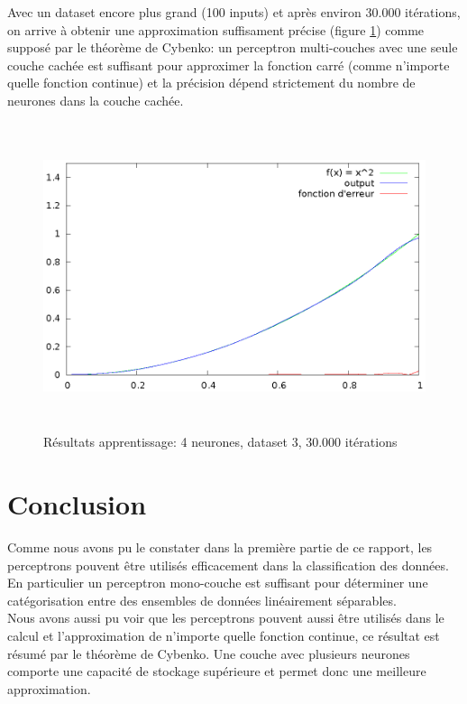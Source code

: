 \documentclass[twoside,openright,a4paper,11pt,french]{article}
\begin{document}
Avec un dataset encore plus grand (100 inputs) et après environ
30.000 itérations, on arrive à obtenir une approximation suffisament
précise (figure \ref{fig:chartsqtest5}) comme supposé par le théorème de Cybenko:
un perceptron multi-couches avec une seule couche cachée est suffisant pour
approximer la fonction carré (comme n'importe quelle fonction continue) 
et la précision dépend strictement du nombre de neurones dans la couche cachée.

\begin{figure}[ht]
\centering
\includegraphics[width=12cm,height=9cm]{./pics/chartsqtest5.eps}
\caption{Résultats apprentissage: 4 neurones, dataset 3, 30.000 itérations}
\label{fig:chartsqtest5}
\end{figure}


\clearpage
\section{Conclusion}
Comme nous avons pu le constater dans la première partie de ce rapport, les
perceptrons pouvent être utilisés efficacement dans la classification des données.
En particulier un perceptron mono-couche est suffisant pour déterminer une
catégorisation entre des ensembles de données linéairement séparables.\\

Nous avons aussi pu voir que les perceptrons pouvent aussi être utilisés dans
le calcul et l'approximation de n'importe quelle fonction continue, ce résultat
est résumé par le théorème de Cybenko.  Une couche avec plusieurs neurones
comporte une capacité de stockage supérieure et permet donc une meilleure
approximation.\\
\end{document}
